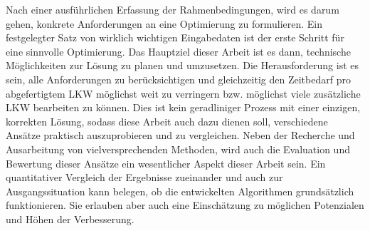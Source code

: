 Nach einer ausführlichen Erfassung der Rahmenbedingungen, wird es darum gehen, konkrete Anforderungen an eine Optimierung zu formulieren. Ein festgelegter Satz von wirklich wichtigen Eingabedaten ist der erste Schritt für eine sinnvolle Optimierung. Das Hauptziel dieser Arbeit ist es dann, technische Möglichkeiten zur Lösung zu planen und umzusetzen. Die Herausforderung ist es sein, alle Anforderungen zu berücksichtigen und gleichzeitig den Zeitbedarf pro abgefertigtem LKW möglichst weit zu verringern bzw. möglichst viele zusätzliche LKW bearbeiten zu können. Dies ist kein geradliniger Prozess mit einer einzigen, korrekten Lösung, sodass diese Arbeit auch dazu dienen soll, verschiedene Ansätze praktisch auszuprobieren und zu vergleichen. Neben der Recherche und Ausarbeitung von vielversprechenden Methoden, wird auch die Evaluation und Bewertung dieser Ansätze ein wesentlicher Aspekt dieser Arbeit sein. Ein quantitativer Vergleich der Ergebnisse zueinander und auch zur Ausgangssituation kann belegen, ob die entwickelten Algorithmen grundsätzlich funktionieren. Sie erlauben aber auch eine Einschätzung zu möglichen Potenzialen und Höhen der Verbesserung.